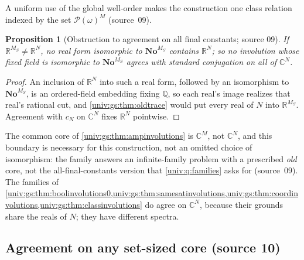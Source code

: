 \documentclass[11pt,letterpaper]{article}
\numberwithin{equation}{section}
\newtheorem{proposition}[proposition]{Proposition}
\theoremstyle{definition}
\theoremstyle{remark}
\newcommand{\No}{\mathbf{No}}
\newcommand{\R}{\mathbb R}
\newcommand{\C}{\mathbb C}
\newcommand{\Q}{\mathbb Q}
\newcommand{\Pow}{\mathcal P}
\begin{document}
A uniform use of the global well-order makes the construction one class relation indexed by the
set $\Pow(\omega)^M$ (source~09).

\begin{proposition}[Obstruction to agreement on all final constants; source 09]\label{univ:gs:prop:coreobstruction}
If $\R^{M_S}\ne\R^N$, no real form isomorphic to $\No^{M_S}$ contains $\R^N$; so no involution
whose fixed field is isomorphic to $\No^{M_S}$ agrees with standard conjugation on all of $\C^N$.
\end{proposition}
\begin{proof}
An inclusion of $\R^N$ into such a real form, followed by an isomorphism to $\No^{M_S}$, is an
ordered-field embedding fixing $\Q$, so each real's image realizes that real's rational cut, and
\cref{univ:gs:thm:oldtrace} would put every real of $N$ into $\R^{M_S}$. Agreement with $c_N$ on
$\C^N$ fixes $\R^N$ pointwise.
\end{proof}

The common core of \cref{univ:gs:thm:ampinvolutions} is $\C^M$, not $\C^N$, and this boundary is
necessary for this construction, not an omitted choice of isomorphism: the family answers an
infinite-family problem with a prescribed \emph{old} core, not the all-final-constants version that
\cref{univ:q:families} asks for (source~09). The families of
\cref{univ:gs:thm:boolinvolutions0,univ:gs:thm:samesatinvolutions,univ:gs:thm:coordinvolutions,univ:gs:thm:classinvolutions}
do agree on $\C^N$, because their grounds share the reals of $N$; they have different spectra.

\subsection{Agreement on any set-sized core (source 10)}
\end{document}
